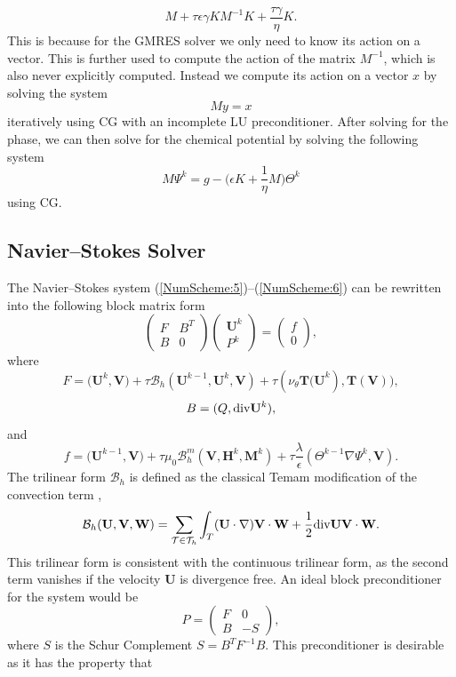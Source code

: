 \documentclass[11pt,fullpage]{article}
\newcommand{\Tau}{\mathcal{T}}
\newcommand{\eps}{\epsilon}
\newcommand{\grad}{\nabla}
\newcommand{\diver}{\textup{div} }
\theoremstyle{lemma}
\theoremstyle{definition}
\theoremstyle{lemma}
\begin{document}
$$
M + \tau\eps\gamma KM^{-1}K + \frac{\tau \gamma}{\eta}K.
$$
This is because for the GMRES solver we only need to know its action on a vector. This is further used to compute the action of the matrix $M^{-1}$, which is also never explicitly computed. Instead we compute its action on a vector $x$ by solving the system
$$
	My = x
$$
iteratively using CG with an incomplete LU preconditioner. After solving for the phase, we can then solve for the chemical potential by solving the following system
$$
M \Psi^k = g - \bigg(\eps K + \frac{1}{\eta}M\bigg)\Theta^k
$$
using CG. 

\subsection{Navier--Stokes Solver}
The Navier--Stokes system (\ref{NumScheme:5})--(\ref{NumScheme:6}) can be rewritten into the following block matrix form
	$$\begin{pmatrix}
F & B^T \\
B & 0
\end{pmatrix}
\begin{pmatrix}
\mathbf{U}^k\\
P^k
\end{pmatrix} = 
\begin{pmatrix}
f\\
0
\end{pmatrix},
$$
where 
$$
F = \big(\mathbf{U}^k, \mathbf{V}\big) + \tau\mathcal{B}_h(\mathbf{U}^{k-1}, \mathbf{U}^k, \mathbf{V}) + \tau(\nu_\theta\mathbf{T(U}^k), \mathbf{T(V)}),
$$
$$
B = (Q, \diver\mathbf{U}^k),
$$
and 
$$
f = \big(\mathbf{U}^{k-1}, \mathbf{V}\big) + \tau\mu_0\mathcal{B}_h^m(\mathbf{V}, \mathbf{H}^k, \mathbf{M}^k) + \tau\frac{\lambda}{\eps}(\Theta^{k-1}\grad \Psi^k, \mathbf{V}).
$$
The trilinear form $\mathcal{B}_h$ is defined as the classical Temam modification of the convection term \cite{temam2001navier},
$$
	\mathcal{B}_h(\mathbf{U}, \mathbf{V}, \mathbf{W}) = \sum_{\Tau\in \Tau_h}\int_T (\mathbf{U}\cdot \grad)\mathbf{V}\cdot\mathbf{W} + \frac{1}{2}\diver\mathbf{U}\mathbf{V}\cdot\mathbf{W}.
$$
This trilinear form is consistent with the continuous trilinear form, as the second term vanishes if the velocity $\mathbf{U}$ is divergence free.
An ideal block preconditioner for the system would be
$$
P = \begin{pmatrix}
	F & 0\\
	B & -S
\end{pmatrix},
$$
where $S$ is the Schur Complement $S = B^TF^{-1}B$. This preconditioner is desirable as it has the property that
\end{document}
